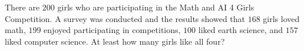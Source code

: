 There are $200$ girls who are participating in the Math and AI 4 Girls Competition. A survey was conducted and the results showed that $168$ girls loved math, $199$ enjoyed participating in competitions, $100$ liked earth science, and $157$ liked computer science. At least how many girls like all four?
